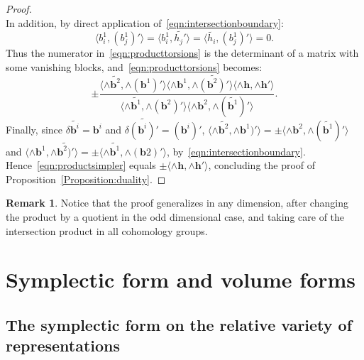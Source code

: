 \documentclass[11pt]{article}
\theoremstyle{definition}
\newtheorem{rema}[theo]{Remark}
\numberwithin{equation}{section}
\numberwithin{figure}{section}
\numberwithin{table}{section}
\newcommand{\bbf}{\mathbf{b}}
\newcommand{\hbf}{\mathbf{h}}
\begin{document}
\begin{proof}
\[\]
In addition, by direct application of~\eqref{eqn:intersectionboundary}:
\[
\langle { b^1_i}, (b^1_j)'\rangle =
\langle { b^1_i}, \widetilde{h_j'}\rangle =
\langle \widetilde {h_i}, (b^1_j)' \rangle=0.
\]
Thus the numerator in~\eqref{eqn:producttorsions} is the determinant of a matrix with some vanishing blocks, and~\eqref{eqn:producttorsions} becomes:
\begin{equation}\label{eqn:productsimpler}
\pm \frac{
\langle \wedge \widetilde{\bbf^2}, \wedge (\bbf^1)'\rangle
\langle \wedge {\bbf^1},\wedge \widetilde{(\bbf^2)'}\rangle
\langle \wedge {\hbf}, \wedge \hbf'\rangle }{
\langle\wedge \widetilde{\bbf^1},\wedge ({\bbf^2})' \rangle
\langle \wedge {\bbf^2},\wedge (\widetilde{\bbf^1})' \rangle }.
\end{equation}
Finally, since $\delta \widetilde{\bbf^i}= \bbf^i$ and $\delta \widetilde{(\bbf^i)'}= (\bbf^i)'$, $
\langle \wedge \widetilde{\bbf^2}, \wedge \bbf^1)'\rangle =\pm \langle \wedge {\bbf^2},\wedge (\widetilde{\bbf^1})' \rangle $ and $
\langle \wedge {\bbf^1},\wedge \widetilde{\bbf^2)'} \rangle =
\pm \langle \wedge \widetilde{\bbf^1},\wedge {(\bbf2)'} \rangle $, by~\eqref{eqn:intersectionboundary}. Hence~\eqref{eqn:productsimpler} equals $\pm \langle \wedge \hbf, \wedge \hbf'\rangle $, concluding the proof of Proposition~\ref{Proposition:duality}.
\end{proof}

\begin{rema}
Notice that the proof generalizes in any dimension, after changing the product by a quotient in the odd dimensional case, and taking care of the intersection product in all cohomology groups.
\end{rema}

\section{Symplectic form and volume forms}\label{Section:forms}

\subsection{The symplectic form on the relative variety of representations}
\end{document}
